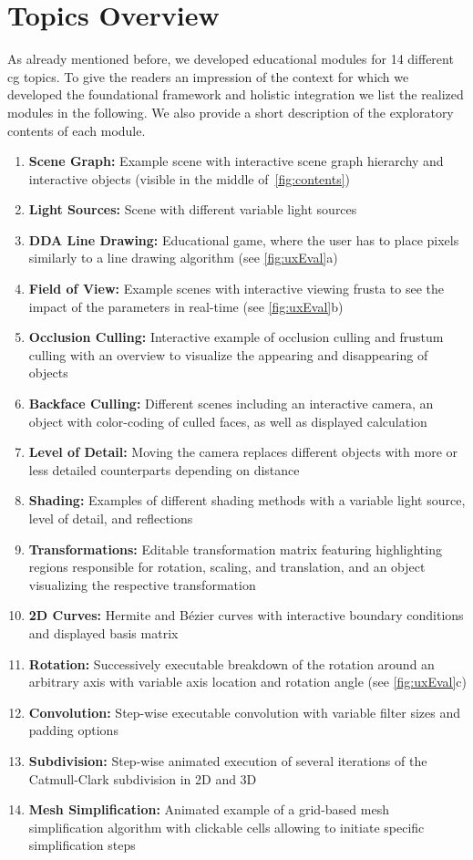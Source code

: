 \section{Topics Overview\label{sec:topics}}
As already mentioned before, we developed educational modules for 14 different \acrshort{cg} topics. To give the readers an impression of the context for which we developed the foundational framework and holistic integration we list the realized modules in the following. We also provide a short description of the exploratory contents of each module.
\begin{enumerate}
	\setlength{\itemsep}{-0.3cm}
	\item \textbf{Scene Graph:} Example scene with interactive scene graph hierarchy and interactive objects (visible in the middle of~\autoref{fig:contents})
	\item \textbf{Light Sources:} Scene with different variable light sources
	\item \textbf{DDA Line Drawing:} Educational game, where the user has to place pixels similarly to a line drawing algorithm (see \autoref{fig:uxEval}a)
	\item \textbf{Field of View:} Example scenes with interactive viewing frusta to see the impact of the parameters in real-time (see \autoref{fig:uxEval}b)
	\item \textbf{Occlusion Culling:} Interactive example of occlusion culling and frustum culling with an overview to visualize the appearing and disappearing of objects
	\item \textbf{Backface Culling:} Different scenes including an interactive camera, an object with color-coding of culled faces, as well as displayed calculation
	\item \textbf{Level of Detail:} Moving the camera replaces different objects with more or less detailed counterparts depending on distance
	\item \textbf{Shading:} Examples of different shading methods with a variable light source, level of detail, and reflections
	\item \textbf{Transformations:} Editable transformation matrix featuring highlighting regions responsible for  rotation, scaling, and translation, and an object visualizing the respective transformation
	\item \textbf{2D Curves:} Hermite and B{\'e}zier curves with interactive boundary conditions and displayed basis matrix
	\item \textbf{Rotation:} Successively executable breakdown of the rotation around an arbitrary axis with variable axis location and rotation angle (see \autoref{fig:uxEval}c)
	\item \textbf{Convolution:} Step-wise executable convolution with variable filter sizes and padding options
	\item \textbf{Subdivision:} Step-wise animated execution of several iterations of the Catmull-Clark subdivision in 2D and 3D
	\item \textbf{Mesh Simplification:} Animated example of a grid-based mesh simplification algorithm with clickable cells allowing to initiate specific simplification steps
\end{enumerate}
